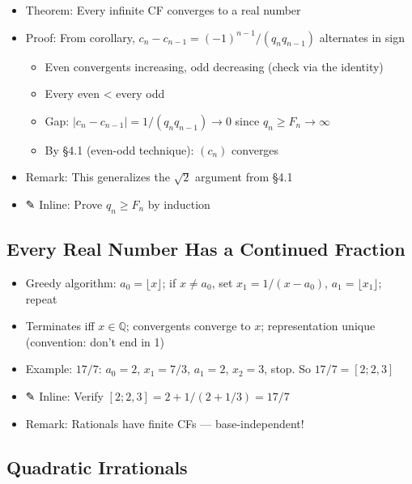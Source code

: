 \documentclass[
  10pt,
  letterpaper,
]{scrbook}
\providecommand{\tightlist}{%
  \setlength{\itemsep}{0pt}\setlength{\parskip}{0pt}}
\newcommand{\QQ}{\mathbb{Q}}
\begin{document}
\begin{itemize}
\tightlist
\item
  Theorem: Every infinite CF converges to a real number
\item
  Proof: From corollary, \(c_n - c_{n-1} = (-1)^{n-1}/(q_n q_{n-1})\)
  alternates in sign

  \begin{itemize}
  \tightlist
  \item
    Even convergents increasing, odd decreasing (check via the identity)
  \item
    Every even \textless{} every odd
  \item
    Gap: \(|c_n - c_{n-1}| = 1/(q_n q_{n-1}) \to 0\) since
    \(q_n \geq F_n \to \infty\)
  \item
    By §4.1 (even-odd technique): \((c_n)\) converges
  \end{itemize}
\item
  Remark: This generalizes the \(\sqrt{2}\) argument from §4.1
\item
  ✎ Inline: Prove \(q_n \geq F_n\) by induction
\end{itemize}

\subsection{Every Real Number Has a Continued
Fraction}\label{every-real-number-has-a-continued-fraction}

\begin{itemize}
\tightlist
\item
  Greedy algorithm: \(a_0 = \lfloor x \rfloor\); if \(x \neq a_0\), set
  \(x_1 = 1/(x - a_0)\), \(a_1 = \lfloor x_1 \rfloor\); repeat
\item
  Terminates iff \(x \in \QQ\); convergents converge to \(x\);
  representation unique (convention: don't end in 1)
\item
  Example: \(17/7\): \(a_0 = 2\), \(x_1 = 7/3\), \(a_1 = 2\),
  \(x_2 = 3\), stop. So \(17/7 = [2; 2, 3]\)
\item
  ✎ Inline: Verify \([2; 2, 3] = 2 + 1/(2 + 1/3) = 17/7\)
\item
  Remark: Rationals have finite CFs --- base-independent!
\end{itemize}

\subsection{Quadratic Irrationals}\label{quadratic-irrationals}
\end{document}
